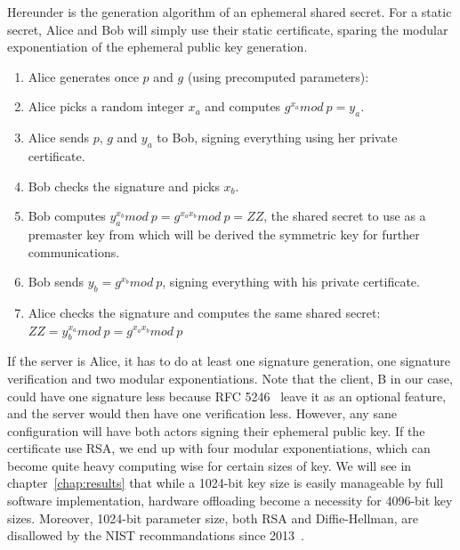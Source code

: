 Hereunder is the generation algorithm of an ephemeral shared secret.
For a static secret, Alice and Bob will simply use their static certificate, sparing the modular exponentiation of the ephemeral public key generation.
\begin{enumerate}
	\item Alice generates once $p$ and $g$ (using precomputed parameters):
	\begin{description}[nosep]
		\item[p] large prime number
		\item[g] a generator of $\mathds{Z}_p^*$
	\end{description}
	\item Alice picks a random integer $x_a$ and computes $g^{x_a} mod\ p = y_a$.
	\item Alice sends $p$, $g$ and $y_a$ to Bob, signing everything using her private certificate.
	\item Bob checks the signature and picks $x_b$.
	\item Bob computes $y_a^{x_b} mod\ p = g^{x_a x_b} mod\ p = ZZ$, the shared secret to use as a premaster key from which will be derived the symmetric key for further communications.
	\item Bob sends $y_b = g^{x_b} mod\ p$, signing everything with his private certificate.
	\item Alice checks the signature and computes the same shared secret: $ZZ = y_b^{x_a} mod\ p = g^{x_a x_b} mod\ p$
\end{enumerate}

If the server is Alice, it has to do at least one signature generation, one signature verification and two modular exponentiations.
Note that the client, B in our case, could have one signature less because RFC 5246~\cite{rfc5246} leave it as an optional feature, and the server would then have one verification less.
However, any sane configuration will have both actors signing their ephemeral public key.
If the certificate use RSA, we end up with four modular exponentiations, which can become quite heavy computing wise for certain sizes of key.
We will see in chapter~\ref{chap:results} that while a 1024-bit key size is easily manageable by full software implementation, hardware offloading become a necessity for 4096-bit key sizes.
Moreover, 1024-bit parameter size, both RSA and Diffie-Hellman, are disallowed by the NIST recommandations since 2013~\cite{nist-sp800-131A}.












